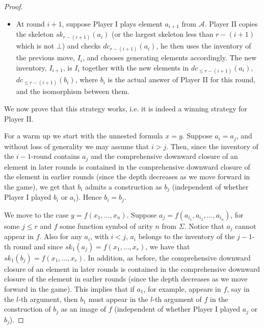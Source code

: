 \documentclass[10pt,a4paper]{amsart}
\begin{document}
\begin{proof}
\begin{itemize}
\item At round $i+1$, suppose Player I plays element $a_{i+1}$ from $\mathcal{A}$. Player II copies the skeleton $sk_{r-(i+1)}(a_i)$ (or the largest skeleton less than $r-(i+1)$ which is not $\bot$) and checks $dc_{r-(i+1)}(a_i)$, he then uses the inventory of the previous move, $I_i$, and chooses generating elements accordingly. The new inventory, $I_{i+1}$, is $I_i$ together with the new elements in $dc_{\leq r-(i+1)}(a_i)$, $dc_{\leq r-(i+1)}(b_i)$, where $b_i$ is the actual answer of Player II for this round, and the isomorphism between them.
\end{itemize}

We now prove that this strategy works, i.e. it is indeed a winning strategy for Player II.

For a warm up we start with the unnested formula $x=y$. Suppose $a_i=a_j$, and without loss of generality we may assume that $i>j$. Then, since the inventory of the $i-1$-round contains $a_j$ and the comprehensive downward closure of an element in later rounds is contained in the comprehensive downward closure of the element in earlier rounds (since the depth decreases as we move forward in the game), we get that $b_i$ admits a construction as $b_j$ (independent of whether Player I played $b_i$ or $a_i$). Hence $b_i=b_j$.   

We move to the case $y=f(x_1, \ldots, x_n)$. Suppose $a_j=f(a_{i_1}, a_{i_2}, \ldots, a_{i_n})$, for some $j\leq r$ and $f$ some function symbol of arity $n$ from $\Sigma$. Notice that $a_j$ cannot appear in $f$. Also for any $a_i$, with $i<j$, $a_i$ belongs to the inventory of the $j-1$-th round and since $sk_1(a_j)=f(x_1,\ldots,x_r)$, we have that $sk_1(b_j)=f(x_1, \ldots,x_r)$. In addition, as before, the comprehensive downward closure of an element in later rounds is contained in the comprehensive downward closure of the element in earlier rounds (since the depth decreases as we move forward in the game). This implies that if $a_1$, for example, appears in $f$, say in the $l$-th argument, then $b_1$ must appear in the $l$-th argument of $f$ in the construction of $b_j$ as an image of $f$ (independent of whether Player I played $a_j$ or $b_j$). 


\end{proof}
\end{document}
